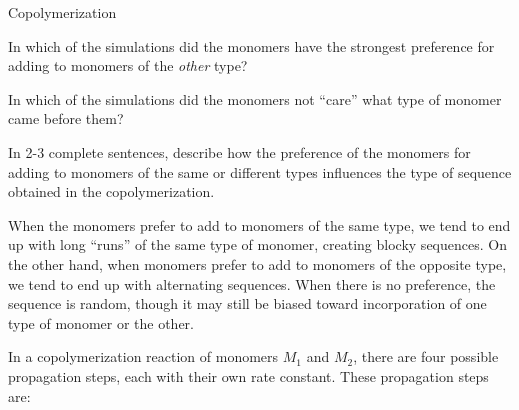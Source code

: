 \begin{activity}{Copolymerization}
\begin{ctqs}
		\begin{solution}[0.85in]\end{solution}
	
	\question In which of the simulations did the monomers have the strongest preference for adding to monomers of the \emph{other} type?
	
		\begin{solution}[0.85in]\end{solution}
	
	\question In which of the simulations did the monomers not ``care'' what type of monomer came before them?
	
		\begin{solution}[0.85in]\end{solution}
	
	\question In 2-3 complete sentences, describe how the preference of the monomers for adding to monomers of the same or different types influences the type of sequence obtained in the copolymerization.
	
		\begin{solution}[2in]
			When the monomers prefer to add to monomers of the same type, we tend to end up with long ``runs'' of the same type of monomer, creating blocky sequences.  On the other hand, when monomers prefer to add to monomers of the opposite type, we tend to end up with alternating sequences.  When there is no preference, the sequence is random, though it may still be biased toward incorporation of one type of monomer or the other.
		\end{solution}
\end{ctqs}

\begin{model}
\label{\labelbase:mdl:kinetics}

	In a copolymerization reaction of monomers $M_1$ and $M_2$, there are four possible propagation steps, each with their own rate constant.  These propagation steps are:
	

\end{model}
\end{activity}
